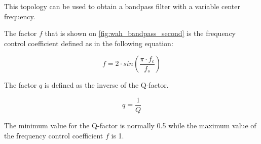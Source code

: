 This topology can be used to obtain a bandpass filter with a variable center frequency. 

The factor $f$ that is shown on \autoref{fig:wah_bandpass_second} is the frequency control coefficient defined as in the following equation:

\begin{equation}
      f = 2 \cdot sin(\frac{\pi \cdot f_{c}}{f_{s}})
\end{equation}

The factor $q$ is defined as the inverse of the Q-factor.

\begin{equation}
			q = \frac{1}{Q}
\end{equation}

The minimum value for the Q-factor is normally 0.5 while the maximum value of the frequency control coefficient $f$ is 1. 


\begin{comment}
sources:
http://www.earlevel.com/main/2003/03/02/the-digital-state-variable-filter/
\end{comment}